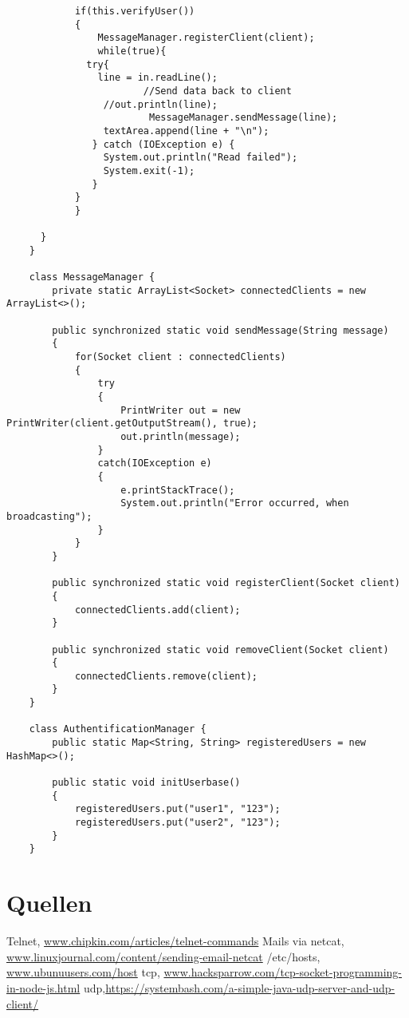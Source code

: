\documentclass[12pt]{article}
\theoremstyle{plain}
\begin{document}
\begin{lstlisting}
			if(this.verifyUser())
			{
				MessageManager.registerClient(client);
				while(true){
		      try{
		        line = in.readLine();
						//Send data back to client
		         //out.println(line);
						 MessageManager.sendMessage(line);
		         textArea.append(line + "\n");
		       } catch (IOException e) {
		         System.out.println("Read failed");
		         System.exit(-1);
		       }
		    }
			}

	  }
	}

	class MessageManager {
		private static ArrayList<Socket> connectedClients = new ArrayList<>();

		public synchronized static void sendMessage(String message)
		{
			for(Socket client : connectedClients)
			{
				try
				{
					PrintWriter out = new PrintWriter(client.getOutputStream(), true);
					out.println(message);
				}
				catch(IOException e)
				{
					e.printStackTrace();
					System.out.println("Error occurred, when broadcasting");
				}
			}
		}

		public synchronized static void registerClient(Socket client)
		{
			connectedClients.add(client);
		}

		public synchronized static void removeClient(Socket client)
		{
			connectedClients.remove(client);
		}
	}

	class AuthentificationManager {
		public static Map<String, String> registeredUsers = new HashMap<>();

		public static void initUserbase()
		{
			registeredUsers.put("user1", "123");
			registeredUsers.put("user2", "123");
		}
	}
\end{lstlisting}
\section{Quellen}
\begin{thebibliography}{50}
 Telnet, \url{www.chipkin.com/articles/telnet-commands}	
 Mails via netcat, \url{www.linuxjournal.com/content/sending-email-netcat}	
 /etc/hosts, \url{www.ubunuusers.com/host}	
 tcp, \url{www.hacksparrow.com/tcp-socket-programming-in-node-js.html}	
udp,\url{https://systembash.com/a-simple-java-udp-server-and-udp-client/}	
\end{thebibliography}
\end{document}
